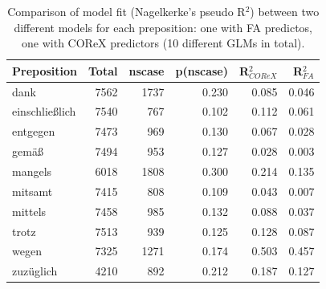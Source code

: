 \begin{table}
  \begin{tabular}{lrrrrr}
  \toprule
            Preposition  & Total  & nscase & p(nscase) & R$^2_{COReX}$ & R$^2_{FA}$ \\
  \midrule
            dank  & 7562   & 1737   & 0.230    & 0.085   & 0.046  \\
  einschließlich  & 7540   &  767   & 0.102    & 0.112   & 0.061 \\
        entgegen  & 7473   &  969   & 0.130    & 0.067   & 0.028 \\
           gemäß  & 7494   &  953   & 0.127    & 0.028   & 0.003 \\
         mangels  & 6018   & 1808   & 0.300    & 0.214   & 0.135 \\
         mitsamt  & 7415   &  808   & 0.109    & 0.043   & 0.007 \\
         mittels  & 7458   &  985   & 0.132    & 0.088   & 0.037 \\
           trotz  & 7513   &  939   & 0.125    & 0.128   & 0.087 \\
           wegen  & 7325   & 1271   & 0.174    & 0.503   & 0.457 \\
       zuzüglich  & 4210   &  892   & 0.212    & 0.187   & 0.127  \\
  \bottomrule
  \end{tabular}
  \caption{Comparison of model fit (Nagelkerke's pseudo R$^2$) between two different models for each preposition: one with FA predictos, one with COReX predictors (10 different GLMs in total).}\label{prepositions-glm-comparison}  
\end{table}


